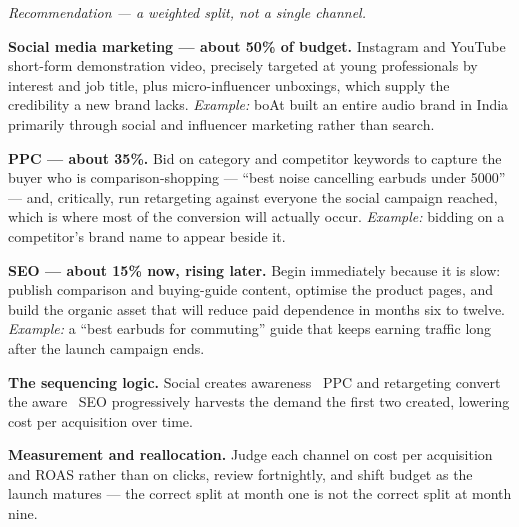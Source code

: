 \begin{qlist}
\textit{Recommendation --- a weighted split, not a single channel.}
\begin{apts}\setcounter{enumi}{3}
\item \textbf{Social media marketing --- about 50\% of budget.} Instagram and
      YouTube short-form demonstration video, precisely targeted at young
      professionals by interest and job title, plus micro-influencer
      unboxings, which supply the credibility a new brand lacks.
      \emph{Example:} boAt built an entire audio brand in India primarily
      through social and influencer marketing rather than search.
\item \textbf{PPC --- about 35\%.} Bid on category and competitor keywords to
      capture the buyer who is comparison-shopping --- ``best noise cancelling
      earbuds under 5000'' --- and, critically, run retargeting against everyone
      the social campaign reached, which is where most of the conversion will
      actually occur. \emph{Example:} bidding on a competitor's brand name to
      appear beside it.
\item \textbf{SEO --- about 15\% now, rising later.} Begin immediately because
      it is slow: publish comparison and buying-guide content, optimise the
      product pages, and build the organic asset that will reduce paid
      dependence in months six to twelve. \emph{Example:} a ``best earbuds for
      commuting'' guide that keeps earning traffic long after the launch
      campaign ends.
\item \textbf{The sequencing logic.} Social creates awareness \ra\ PPC and
      retargeting convert the aware \ra\ SEO progressively harvests the demand
      the first two created, lowering cost per acquisition over time.
\item \textbf{Measurement and reallocation.} Judge each channel on cost per
      acquisition and ROAS rather than on clicks, review fortnightly, and shift
      budget as the launch matures --- the correct split at month one is not the
      correct split at month nine.
\end{apts}


\end{qlist}
